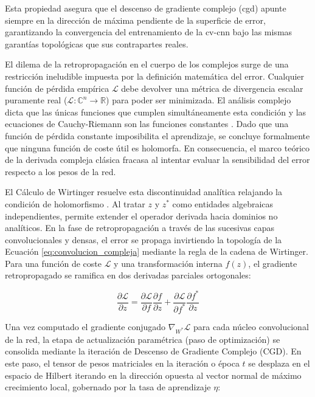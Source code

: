 Esta propiedad asegura que el descenso de gradiente complejo (\gls{cgd}) apunte siempre en la dirección de máxima pendiente de la superficie de error, garantizando la convergencia del entrenamiento de la \gls{cv-cnn} bajo las mismas garantías topológicas que sus contrapartes reales.

El dilema de la retropropagación en el cuerpo de los complejos surge de una restricción ineludible impuesta por la definición matemática del error. Cualquier función de pérdida empírica $\mathcal{L}$ debe devolver una métrica de divergencia escalar puramente real ($\mathcal{L}: \mathbb{C}^n \rightarrow \mathbb{R}$) para poder ser minimizada. El análisis complejo dicta que las únicas funciones que cumplen simultáneamente esta condición y las ecuaciones de Cauchy-Riemann son las funciones constantes \cite{bouboulis_extension_2011}. Dado que una función de pérdida constante imposibilita el aprendizaje, se concluye formalmente que ninguna función de coste útil es holomorfa. En consecuencia, el marco teórico de la derivada compleja clásica fracasa al intentar evaluar la sensibilidad del error respecto a los pesos de la red.

El Cálculo de Wirtinger resuelve esta discontinuidad analítica relajando la condición de holomorfismo \cite{bouboulis_extension_2011}. Al tratar $z$ y $z^*$ como entidades algebraicas independientes, permite extender el operador derivada hacia dominios no analíticos. En la fase de retropropagación a través de las sucesivas capas convolucionales y densas, el error se propaga invirtiendo la topología de la Ecuación \ref{eq:convolucion_compleja} mediante la regla de la cadena de Wirtinger. Para una función de coste $\mathcal{L}$ y una transformación interna $f(z)$, el gradiente retropropagado se ramifica en dos derivadas parciales ortogonales:

\begin{equation}
    \frac{\partial \mathcal{L}}{\partial z} = \frac{\partial \mathcal{L}}{\partial f} \frac{\partial f}{\partial z} + \frac{\partial \mathcal{L}}{\partial f^*} \frac{\partial f^*}{\partial z}
    \label{eq:regla_cadena_wirtinger}
\end{equation}

Una vez computado el gradiente conjugado $\nabla_{W^*} \mathcal{L}$ para cada núcleo convolucional de la red, la etapa de actualización paramétrica (paso de optimización) se consolida mediante la iteración de Descenso de Gradiente Complejo (CGD). En este paso, el tensor de pesos matriciales en la iteración o época $t$ se desplaza en el espacio de Hilbert iterando en la dirección opuesta al vector normal de máximo crecimiento local, gobernado por la tasa de aprendizaje $\eta$:

